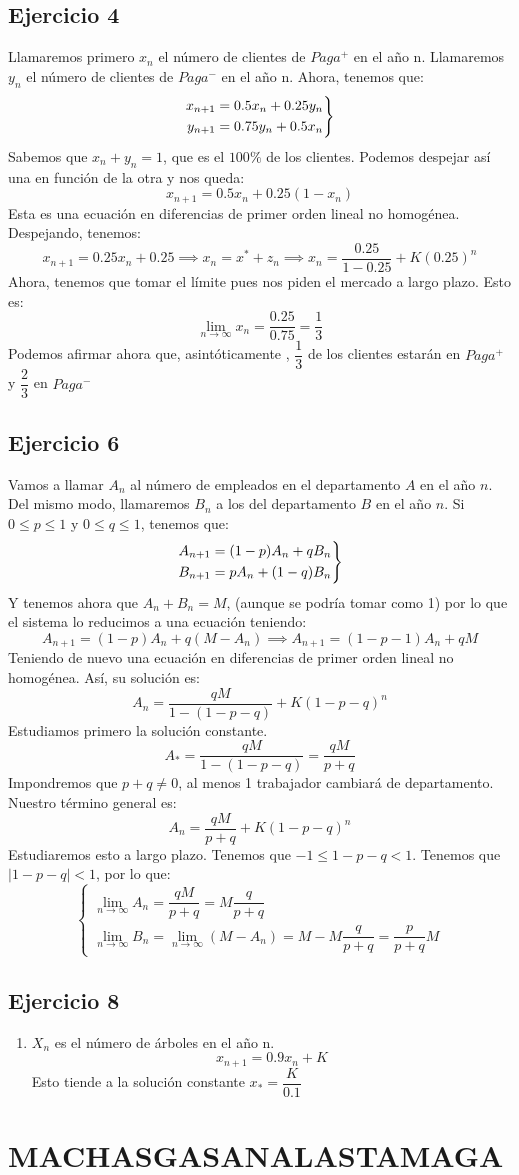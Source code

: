 \documentclass[11pt, a4paper, titlepage]{article}
\theoremstyle{theorem-style}
\theoremstyle{definition-style}
\theoremstyle{remark-style}
\theoremstyle{example-style}
\newenvironment{rcases}
  {\left.\begin{aligned}}
  {\end{aligned}\right\rbrace}
\begin{document}
\subsection{Ejercicio 4}
Llamaremos primero $x_n$ el número de clientes de $Paga^+$ en el año n.
Llamaremos $y_n$ el número de clientes de $Paga^-$ en el año n.
Ahora, tenemos que:
\[
\begin{rcases}
	x _{n+1} =0.5 x_n + 0.25 y_n \\
	y _{n+1} = 0.75 y_n +  0.5 x_n 
\end{rcases}
\]
Sabemos que $x_n+y_n = 1$, que es el $100\%$ de los clientes. Podemos despejar así una en función de la otra y nos queda:
\[
x _{n+1} = 0.5 x_n + 0.25(1-x_n)
\]
Esta es una ecuación en diferencias de primer orden lineal no homogénea. Despejando, tenemos:
\[
x _{n+1} = 0.25 x_n +0.25 \implies x_n =  x^* + z_n \implies x_n =  \dfrac{0.25}{1-0.25} + K(0.25)^n
\]
Ahora, tenemos que tomar el límite pues nos piden el mercado a largo plazo. Esto es:
\[
\lim_{n\to \infty}x_n = \dfrac{0.25}{0.75} = \dfrac{1}{3}
\]
Podemos afirmar ahora que, asintóticamente , $\dfrac{1}{3}$ de los clientes estarán en $Paga^+$ y $\dfrac{2}{3}$ en $Paga^-$

\subsection{Ejercicio 6}
Vamos a llamar $A_n$ al número de empleados en el departamento $A$ en el año $n$. Del mismo modo, llamaremos $B_n$ a los del departamento $B$ en el año $n$. Si $0 \leq p \leq 1$  y $0 \leq q \leq 1$, tenemos que:
\[
\begin{rcases}
	A _{n+1} = (1-p)A_n + qB_n\\
	B _{n+1}= pA_n + (1-q)B_n
\end{rcases}
\]
Y tenemos ahora que $A_n + B_n = M$, (aunque se podría tomar como 1) por lo que el sistema lo reducimos a una ecuación teniendo:
\[
A _{n+1} = (1-p)A_n +q(M-A_n)\implies A _{n+1} =(1-p-1)A_n +qM
\]
Teniendo de nuevo una ecuación en diferencias de primer orden lineal no homogénea. Así, su solución es:
\[
A_n = \dfrac{qM}{1-(1-p-q)} + K(1-p-q)^n
\]
Estudiamos primero la solución constante.
\[
A_* = \dfrac{qM}{1-(1-p-q)}= \dfrac{qM}{p+q}
\]
Impondremos que $p+q\ne 0$, al menos 1 trabajador cambiará de departamento.
Nuestro término general es:
\[
A_n = \dfrac{qM}{p+q} + K(1-p-q)^n
\]
Estudiaremos esto a largo plazo. Tenemos que $-1 \leq 1-p-q < 1$. Tenemos que $|1-p-q| < 1$, por lo que:
\[ \begin{cases}
	\lim_{n \to \infty} A_n = \dfrac{qM}{p+q} = M \dfrac{q}{p+q}\\
	\lim_{n \to \infty}B_n = \lim_{n\to \infty}(M-A_n) = M- M \dfrac{q}{p+q} = \dfrac{p}{p+q}M
\end{cases}
\]

\subsection{Ejercicio 8}
\begin{enumerate}
	\item $X_n$ es el número de árboles en el año n.
	\[
	x _{n+1} = 0.9 x_n +K
	\]
	Esto tiende a la solución constante $x_* = \dfrac{K}{0.1}$
\end{enumerate}

\section{MACHASGASANALASTAMAGA}
\end{document}
